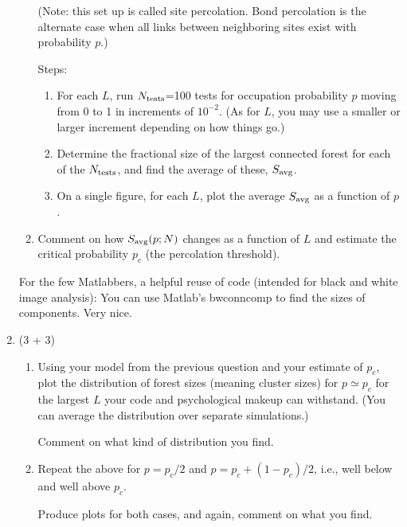 \begin{enumerate}
\begin{enumerate}
    (Note: this set up is called site percolation.  Bond percolation
    is the alternate case when all links between neighboring sites exist
    with probability $p$.)

    Steps:
    \begin{enumerate}
    \item 
      For each $L$, run $N_{\rm tests}$=100 tests for occupation probability $p$
      moving from 0 to 1 in increments of $10^{-2}$.
      (As for $L$, you may use a smaller or larger increment depending on how
      things go.)
    \item 
      Determine the fractional size of the largest connected forest
      for each of the $N_{\rm tests}$, and find the average of these,
      $S_{\rm avg}$.
    \item 
      On a single figure, for each $L$, plot the average $S_{\rm avg}$ as a function of $p$.
    \end{enumerate}

  \item
    Comment on how $S_{\rm avg}(p;N)$ changes as a function of $L$
    and estimate the critical probability $p_c$ (the percolation threshold).
  \end{enumerate}

  For the few Matlabbers,
  a helpful reuse of code (intended for black and white image analysis): 
  You can use Matlab's bwconncomp to find 
  the sizes of components.  Very nice.

  
   \solutionstart


   \solutionend


\item (3 + 3)

  \begin{enumerate}
  \item 
    Using your model from the previous question and your
    estimate of $p_c$, plot the distribution of forest sizes
    (meaning cluster sizes)
    for $p \simeq p_c$ for the largest $L$ your code
    and psychological makeup can withstand.
    (You can average the distribution over separate simulations.)

    Comment on what kind of distribution you find.

  \item
    Repeat the above for $p=p_c/2$ and $p=p_c + (1-p_c)/2$,
    i.e., well below and well above $p_c$.

    Produce plots for both cases,
    and again, comment on what you find.
  \end{enumerate}


\end{enumerate}
